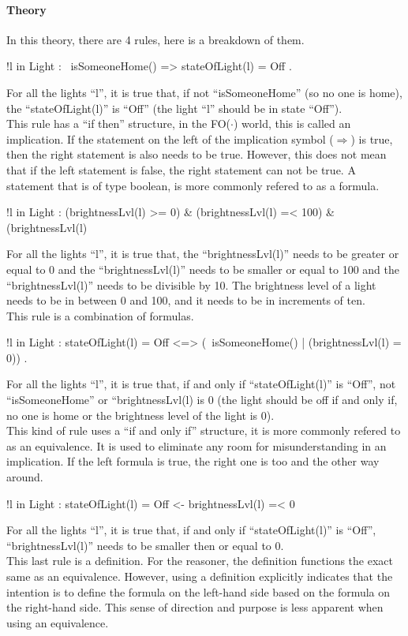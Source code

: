 \documentclass[11pt,a4paper]{report}
\newcommand{\fodot}{FO($\cdot$)\xspace}
\begin{document}
\paragraph{Theory}
In this theory, there are 4 rules, here is a breakdown of them.
\begin{idplisting}
    !l in Light : ~isSomeoneHome() => stateOfLight(l) = Off .
\end{idplisting}
For all the lights ``l'', it is true that, if not ``isSomeoneHome'' (so no one is home), the ``stateOfLight(l)'' is ``Off'' (the light ``l'' should be in state ``Off'').\\
This rule has a ``if then'' structure, in the \fodot world, this is called an implication. If the statement on the left of the implication symbol ($\Rightarrow$) is true, then the right statement is also needs to be true. However, this does not mean that if the left statement is false, the right statement can not be true. A statement that is of type boolean, is more commonly refered to as a formula.
\begin{idplisting}
    !l in Light : (brightnessLvl(l) >= 0) & (brightnessLvl(l) =< 100) & (brightnessLvl(l) %
\end{idplisting}
For all the lights ``l'', it is true that, the ``brightnessLvl(l)'' needs to be greater or equal to 0 and the ``brightnessLvl(l)'' needs to be smaller or equal to 100 and the ``brightnessLvl(l)'' needs to be divisible by 10. The brightness level of a light needs to be in between 0 and 100, and it needs to be in increments of ten.\\
This rule is a combination of formulas.
\begin{idplisting}
    !l in Light : stateOfLight(l) = Off <=> (~isSomeoneHome() | (brightnessLvl(l) = 0)) .
\end{idplisting}
For all the lights ``l'', it is true that, if and only if ``stateOfLight(l)'' is ``Off'', not ``isSomeoneHome'' or ``brightnessLvl(l) is 0 (the light should be off if and only if, no one is home or the brightness level of the light is 0).\\
This kind of rule uses a ``if and only if'' structure, it is more commonly refered to as an equivalence. It is used to eliminate any room for misunderstanding in an implication. If the left formula is true, the right one is too and the other way around.

\begin{idplisting}
    {
       !l in Light : stateOfLight(l) = Off <- brightnessLvl(l) =< 0
    }
\end{idplisting}
For all the lights ``l'', it is true that, if and only if ``stateOfLight(l)'' is ``Off'', ``brightnessLvl(l)'' needs to be smaller then or equal to 0.\\
This last rule is a definition. For the reasoner, the definition functions the exact same as an equivalence. However, using a definition explicitly indicates that the intention is to define the formula on the left-hand side based on the formula on the right-hand side. This sense of direction and purpose is less apparent when using an equivalence.
\end{document}
